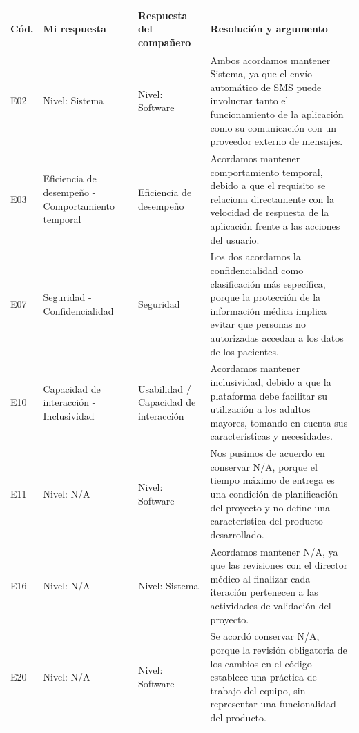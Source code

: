 \documentclass[11pt,a4paper]{article}
\begin{document}
{\small
\begin{longtable}{|>{\raggedright\arraybackslash}p{0.7cm}|>{\raggedright\arraybackslash}p{3.2cm}|>{\raggedright\arraybackslash}p{3.2cm}|>{\raggedright\arraybackslash}p{7.6cm}|}
\hline
\textbf{Cód.} & \textbf{Mi respuesta} & \textbf{Respuesta del compañero} & \textbf{Resolución y argumento} \\ \hline
\endhead
E02 & Nivel: Sistema & Nivel: Software & Ambos acordamos mantener Sistema, ya que el envío automático de SMS puede involucrar tanto el funcionamiento de la aplicación como su comunicación con un proveedor externo de mensajes.\\ \hline
E03 & Eficiencia de desempeño - Comportamiento temporal & Eficiencia de desempeño & Acordamos mantener comportamiento temporal, debido a que el requisito se relaciona directamente con la velocidad de respuesta de la aplicación frente a las acciones del usuario. \\ \hline
E07 & Seguridad - Confidencialidad & Seguridad & Los dos acordamos la confidencialidad como clasificación más específica, porque la protección de la información médica implica evitar que personas no autorizadas accedan a los datos de los pacientes. \\ \hline
E10 & Capacidad de interacción - Inclusividad & Usabilidad / Capacidad de interacción & Acordamos mantener inclusividad, debido a que la plataforma debe facilitar su utilización a los adultos mayores, tomando en cuenta sus características y necesidades.\\ \hline
E11 & Nivel: N/A & Nivel: Software & Nos pusimos de acuerdo en conservar N/A, porque el tiempo máximo de entrega es una condición de planificación del proyecto y no define una característica del producto desarrollado. \\ \hline
E16 & Nivel: N/A & Nivel: Sistema & Acordamos mantener N/A, ya que las revisiones con el director médico al finalizar cada iteración pertenecen a las actividades de validación del proyecto.\\ \hline
E20 & Nivel: N/A & Nivel: Software & Se acordó conservar N/A, porque la revisión obligatoria de los cambios en el código establece una práctica de trabajo del equipo, sin representar una funcionalidad del producto. \\ \hline
\end{longtable}
}

\end{document}
